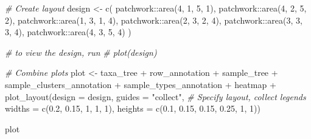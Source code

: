 \documentclass[
]{book}
\newenvironment{Shaded}{\begin{snugshade}}{\end{snugshade}}
\newcommand{\AttributeTok}[1]{\textcolor[rgb]{0.77,0.63,0.00}{#1}}
\newcommand{\CommentTok}[1]{\textcolor[rgb]{0.56,0.35,0.01}{\textit{#1}}}
\newcommand{\DecValTok}[1]{\textcolor[rgb]{0.00,0.00,0.81}{#1}}
\newcommand{\FloatTok}[1]{\textcolor[rgb]{0.00,0.00,0.81}{#1}}
\newcommand{\FunctionTok}[1]{\textcolor[rgb]{0.00,0.00,0.00}{#1}}
\newcommand{\NormalTok}[1]{#1}
\newcommand{\OtherTok}[1]{\textcolor[rgb]{0.56,0.35,0.01}{#1}}
\newcommand{\SpecialCharTok}[1]{\textcolor[rgb]{0.00,0.00,0.00}{#1}}
\newcommand{\StringTok}[1]{\textcolor[rgb]{0.31,0.60,0.02}{#1}}
\begin{document}
\begin{Shaded}
\begin{Highlighting}[]
\CommentTok{\# Create layout}
\NormalTok{design }\OtherTok{\textless{}{-}} \FunctionTok{c}\NormalTok{(}
\NormalTok{  patchwork}\SpecialCharTok{::}\FunctionTok{area}\NormalTok{(}\DecValTok{4}\NormalTok{, }\DecValTok{1}\NormalTok{, }\DecValTok{5}\NormalTok{, }\DecValTok{1}\NormalTok{),}
\NormalTok{  patchwork}\SpecialCharTok{::}\FunctionTok{area}\NormalTok{(}\DecValTok{4}\NormalTok{, }\DecValTok{2}\NormalTok{, }\DecValTok{5}\NormalTok{, }\DecValTok{2}\NormalTok{),}
\NormalTok{  patchwork}\SpecialCharTok{::}\FunctionTok{area}\NormalTok{(}\DecValTok{1}\NormalTok{, }\DecValTok{3}\NormalTok{, }\DecValTok{1}\NormalTok{, }\DecValTok{4}\NormalTok{),}
\NormalTok{  patchwork}\SpecialCharTok{::}\FunctionTok{area}\NormalTok{(}\DecValTok{2}\NormalTok{, }\DecValTok{3}\NormalTok{, }\DecValTok{2}\NormalTok{, }\DecValTok{4}\NormalTok{),}
\NormalTok{  patchwork}\SpecialCharTok{::}\FunctionTok{area}\NormalTok{(}\DecValTok{3}\NormalTok{, }\DecValTok{3}\NormalTok{, }\DecValTok{3}\NormalTok{, }\DecValTok{4}\NormalTok{),}
\NormalTok{  patchwork}\SpecialCharTok{::}\FunctionTok{area}\NormalTok{(}\DecValTok{4}\NormalTok{, }\DecValTok{3}\NormalTok{, }\DecValTok{5}\NormalTok{, }\DecValTok{4}\NormalTok{)}
\NormalTok{)}

\CommentTok{\# to view the design, run}
\CommentTok{\# plot(design)}

\CommentTok{\# Combine plots}
\NormalTok{plot }\OtherTok{\textless{}{-}}\NormalTok{ taxa\_tree }\SpecialCharTok{+} 
\NormalTok{  row\_annotation }\SpecialCharTok{+}
\NormalTok{  sample\_tree }\SpecialCharTok{+} 
\NormalTok{  sample\_clusters\_annotation }\SpecialCharTok{+}
\NormalTok{  sample\_types\_annotation }\SpecialCharTok{+}
\NormalTok{  heatmap }\SpecialCharTok{+}
    \FunctionTok{plot\_layout}\NormalTok{(}\AttributeTok{design =}\NormalTok{ design, }\AttributeTok{guides =} \StringTok{"collect"}\NormalTok{, }\CommentTok{\# Specify layout, collect legends}
                \AttributeTok{widths =} \FunctionTok{c}\NormalTok{(}\FloatTok{0.2}\NormalTok{, }\FloatTok{0.15}\NormalTok{, }\DecValTok{1}\NormalTok{, }\DecValTok{1}\NormalTok{, }\DecValTok{1}\NormalTok{),}
                \AttributeTok{heights =} \FunctionTok{c}\NormalTok{(}\FloatTok{0.1}\NormalTok{, }\FloatTok{0.15}\NormalTok{, }\FloatTok{0.15}\NormalTok{, }\FloatTok{0.25}\NormalTok{, }\DecValTok{1}\NormalTok{, }\DecValTok{1}\NormalTok{))}

\NormalTok{plot}
\end{Highlighting}
\end{Shaded}
\end{document}
